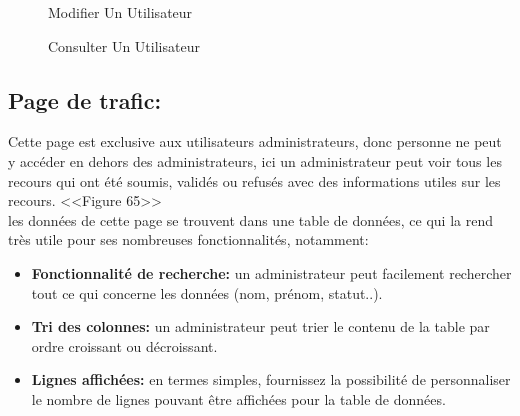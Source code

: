 \documentclass[12pt]{report}
\begin{document}
\newpage

\begin{figure}[H]
\centering
  \vspace*{-0.3in}
  \hspace*{-0.1in}
\caption{Modifier Un Utilisateur}
\end{figure}

\begin{figure}[H]
\centering
  \vspace*{0.05in}
  \hspace*{-0.1in}
\caption{Consulter Un Utilisateur}
  \vspace*{-0.1in}
\end{figure}

\newpage

\vspace*{-0.6in}
\subsection{Page de trafic:}

Cette page est exclusive aux utilisateurs administrateurs, donc personne ne peut y accéder en dehors des administrateurs, ici un administrateur peut voir tous les recours qui ont été soumis, validés ou refusés avec des informations utiles sur les recours. <<Figure 65>>
\\
les données de cette page se trouvent dans une table de données, ce qui la rend très utile pour ses nombreuses fonctionnalités, notamment:

\begin{itemize}
  \item \textbf{Fonctionnalité de recherche:} un administrateur peut facilement rechercher tout ce qui concerne les données (nom, prénom, statut..).
  \item \textbf{Tri des colonnes:} un administrateur peut trier le contenu de la table par ordre croissant ou décroissant.
  \item \textbf{Lignes affichées:} en termes simples, fournissez la possibilité de personnaliser le nombre de lignes pouvant être affichées pour la table de données.
\end{itemize}

\vspace{0.1in}
\end{document}
